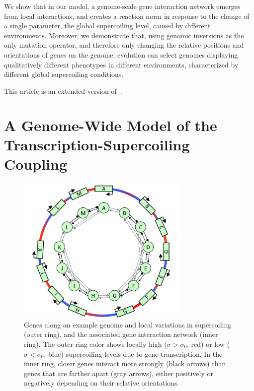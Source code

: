 We show that in our model, a genome-scale gene interaction network emerges from local interactions, and creates a reaction norm in response to the change of a single parameter, the global supercoiling level, caused by different environments.
Moreover, we demonstrate that, using genomic inversions as the only mutation operator, and therefore only changing the relative positions and orientations of genes on the genome, evolution can select genomes displaying qualitatively different phenotypes in different environments, characterized by different global supercoiling conditions.

This article is an extended version of~\cite{grohens2021}.

\section{A Genome-Wide Model of the Transcription-Supercoiling Coupling}
\label{sec:alife:indiv_model}

\begin{figure}[H]
  \centering
  \includegraphics[width=0.75\textwidth]{alife/img/reseau.png}
  \caption[Hand-drawn genome and local interactions resulting from the TSC]{Genes along an example genome and local variations in supercoiling (outer ring), and the associated gene interaction network (inner ring).
  The outer ring color shows locally high ($\sigma > \sigma_0$, red) or low ($\sigma < \sigma_0$, blue) supercoiling levels due to gene transcription.
  In the inner ring, closer genes interact more strongly (black arrows) than genes that are farther apart (gray arrows), either positively or negatively depending on their relative orientations.}
  \label{fig:alife:network}
\end{figure}

